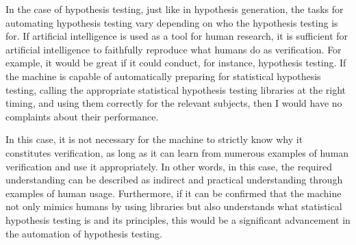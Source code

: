 

In the case of hypothesis testing, just like in hypothesis generation, the tasks for automating hypothesis testing vary depending on who the hypothesis testing is for. If artificial intelligence is used as a tool for human research, it is sufficient for artificial intelligence to faithfully reproduce what humans do as verification. For example, it would be great if it could conduct, for instance, hypothesis testing. If the machine is capable of automatically preparing for statistical hypothesis testing, calling the appropriate statistical hypothesis testing libraries at the right timing, and using them correctly for the relevant subjects, then I would have no complaints about their performance.

In this case, it is not necessary for the machine to strictly know why it constitutes verification, as long as it can learn from numerous examples of human verification and use it appropriately. In other words, in this case, the required understanding can be described as indirect and practical understanding through examples of human usage. Furthermore, if it can be confirmed that the machine not only mimics humans by using libraries but also understands what statistical hypothesis testing is and its principles, this would be a significant advancement in the automation of hypothesis testing. 

